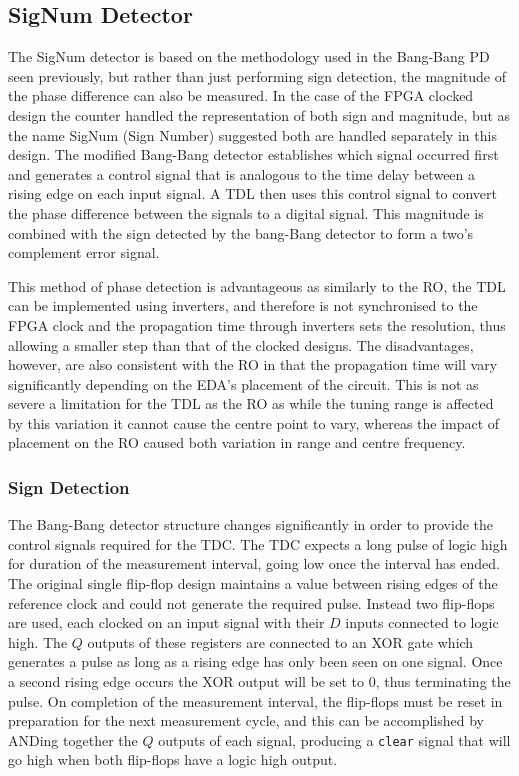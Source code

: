 \subsection{SigNum Detector}
The SigNum detector is based on the methodology used in the Bang-Bang \acl{PD} seen previously, but rather than just performing sign detection, the magnitude of the phase difference can also be measured. In the case of the \ac{FPGA} clocked design the counter handled the representation of both sign and magnitude, but as the name SigNum (Sign Number) suggested both are handled separately in this design. The modified Bang-Bang detector establishes which signal occurred first and generates a control signal that is analogous to the time delay between a rising edge on each input signal. A \ac{TDL} then uses this control signal to convert the phase difference between the signals to a digital signal. This magnitude is combined with the sign detected by the bang-Bang detector to form a two's complement error signal.

This method of phase detection is advantageous as similarly to the \acl{RO}, the \ac{TDL} can be implemented using inverters, and therefore is not synchronised to the \ac{FPGA} clock and the propagation time through inverters sets the resolution, thus allowing a smaller step than that of the clocked designs. The disadvantages, however, are also consistent with the \ac{RO} in that the propagation time will vary significantly depending on the \ac{EDA}'s placement of the circuit. This is not as severe a limitation for the \ac{TDL} as the \ac{RO} as while the tuning range is affected by this variation it cannot cause the centre point to vary, whereas the impact of placement on the \ac{RO} caused both variation in range and centre frequency.


\subsubsection{Sign Detection}
The Bang-Bang detector structure changes significantly in order to provide the control signals required for the \ac{TDC}. The \ac{TDC} expects a long pulse of logic high for duration of the measurement interval, going low once the interval has ended. The original single flip-flop design maintains a value between rising edges of the reference clock and could not generate the required pulse. Instead two flip-flops are used, each clocked on an input signal with their $D$ inputs connected to logic high. The $Q$ outputs of these registers are connected to an \acs{XOR} gate which generates a pulse as long as a rising edge has only been seen on one signal. Once a second rising edge occurs the \acs{XOR} output will be set to 0, thus terminating the pulse. On completion of the measurement interval, the flip-flops must be reset in preparation for the next measurement cycle, and this can be accomplished by ANDing together the $Q$ outputs of each signal, producing a \texttt{clear} signal that will go high when both flip-flops have a logic high output.

